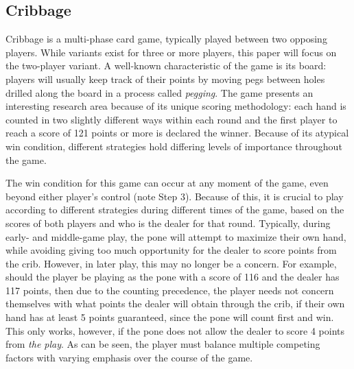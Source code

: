

\subsection{Cribbage}

Cribbage is a multi-phase card game, typically played between two opposing
players.
%
While variants exist for three or more players, this paper will focus on the
two-player variant.
%
A well-known characteristic of the game is its board:
players will usually keep track of their points by moving pegs
between holes drilled along the board
in a process called \textit{pegging}.
%
The game presents an interesting research area because of its unique scoring
methodology:
each hand is counted in two slightly different ways within each round and the
first player to reach a score of 121 points or more is declared the winner.
%
Because of its atypical win condition, different strategies hold differing
levels of importance throughout the game.




The win condition for this game can occur at any moment of the game,
even beyond either player's control (note Step 3).
%
Because of this,
it is crucial to play according to different strategies during
different times of the game,
based on the scores of both players and who is the dealer for that round.
%
Typically, during early- and middle-game play,
the pone will attempt to maximize their own hand,
while avoiding giving too much opportunity for the dealer to score points from
the crib.
%
However, in later play, this may no longer be a concern.
%
For example, should the player be playing as the pone with a score of 116
and the dealer has 117 points,
then due to the counting precedence,
the player needs not concern themselves with what points the dealer will obtain
through the crib, if their own hand has at least 5 points guaranteed,
since the pone will count first and win.
%
This only works, however, if the pone does not allow the dealer to score 4
points from \textit{the play}.
%
As can be seen, the player must balance multiple competing factors with varying
emphasis over the course of the game.

